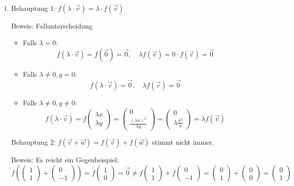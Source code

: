 \begin{enumerate}
    \item Behauptung 1: \( f(\lambda \cdot \vec{v}) = \lambda \cdot f(\vec{v}) \)
    
    Beweis: Fallunterscheidung
    \begin{itemize}
        \item Falls \( \lambda = 0 \):
        \[
        f(\lambda \cdot \vec{v}) = f(\vec{0}) = \vec{0}, \quad \lambda f(\vec{v}) = 0 \cdot f(\vec{v}) = \vec{0}
        \]
        
        \item Falls \( \lambda \neq 0, y = 0 \):
        \[
        f(\lambda \cdot \vec{v}) = \vec{0}, \quad \lambda f(\vec{v}) = \vec{0}
        \]
        
        \item Falls \( \lambda \neq 0, y \neq 0 \):
        \[
        f(\lambda \cdot \vec{v}) = f \begin{pmatrix} \lambda x \\ \lambda y \end{pmatrix} = \begin{pmatrix} 0 \\ \frac{(\lambda x)^2}{\lambda y} \end{pmatrix} = \begin{pmatrix} 0 \\ \lambda \frac{x^2}{y} \end{pmatrix} = \lambda f(\vec{v})
        \]
    \end{itemize}

    Behauptung 2: \( f(\vec{v} + \vec{w}) = f(\vec{v}) + f(\vec{w}) \) stimmt nicht immer.

    Beweis: Es reicht ein Gegenbeispiel:
    \[
    f \left( \begin{pmatrix} 1 \\ 1 \end{pmatrix} + \begin{pmatrix} 0 \\ -1 \end{pmatrix} \right) = f \begin{pmatrix} 1 \\ 0 \end{pmatrix} = \vec{0} \neq f \begin{pmatrix} 1 \\ 1  \end{pmatrix} + f \begin{pmatrix} 0\\ -1  \end{pmatrix} = \begin{pmatrix} 0 \\ 1  \end{pmatrix} +  \begin{pmatrix} 0\\ 0  \end{pmatrix} = \begin{pmatrix}
        0\\1
    \end{pmatrix}
    \]
\end{enumerate}
